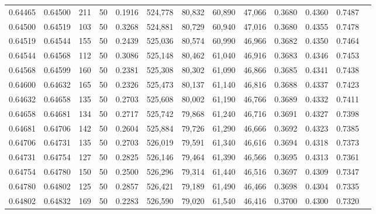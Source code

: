 \begin{tabular}{rrrrrrrrrrrrr}
0.64465 & 0.64500 &   211 &  50 &                                     0.1916 & 524,778 &  80,832 &  60,890 &  47,066 & 0.3680 & 0.4360 & 0.7487 \\
0.64500 & 0.64519 &   103 &  50 &                                     0.3268 & 524,881 &  80,729 &  60,940 &  47,016 & 0.3680 & 0.4355 & 0.7478 \\
0.64519 & 0.64544 &   155 &  50 &                                     0.2439 & 525,036 &  80,574 &  60,990 &  46,966 & 0.3682 & 0.4350 & 0.7464 \\
0.64544 & 0.64568 &   112 &  50 &                                     0.3086 & 525,148 &  80,462 &  61,040 &  46,916 & 0.3683 & 0.4346 & 0.7453 \\
0.64568 & 0.64599 &   160 &  50 &                                     0.2381 & 525,308 &  80,302 &  61,090 &  46,866 & 0.3685 & 0.4341 & 0.7438 \\
0.64600 & 0.64632 &   165 &  50 &                                     0.2326 & 525,473 &  80,137 &  61,140 &  46,816 & 0.3688 & 0.4337 & 0.7423 \\
0.64632 & 0.64658 &   135 &  50 &                                     0.2703 & 525,608 &  80,002 &  61,190 &  46,766 & 0.3689 & 0.4332 & 0.7411 \\
0.64658 & 0.64681 &   134 &  50 &                                     0.2717 & 525,742 &  79,868 &  61,240 &  46,716 & 0.3691 & 0.4327 & 0.7398 \\
0.64681 & 0.64706 &   142 &  50 &                                     0.2604 & 525,884 &  79,726 &  61,290 &  46,666 & 0.3692 & 0.4323 & 0.7385 \\
0.64706 & 0.64731 &   135 &  50 &                                     0.2703 & 526,019 &  79,591 &  61,340 &  46,616 & 0.3694 & 0.4318 & 0.7373 \\
0.64731 & 0.64754 &   127 &  50 &                                     0.2825 & 526,146 &  79,464 &  61,390 &  46,566 & 0.3695 & 0.4313 & 0.7361 \\
0.64754 & 0.64780 &   150 &  50 &                                     0.2500 & 526,296 &  79,314 &  61,440 &  46,516 & 0.3697 & 0.4309 & 0.7347 \\
0.64780 & 0.64802 &   125 &  50 &                                     0.2857 & 526,421 &  79,189 &  61,490 &  46,466 & 0.3698 & 0.4304 & 0.7335 \\
0.64802 & 0.64832 &   169 &  50 &                                     0.2283 & 526,590 &  79,020 &  61,540 &  46,416 & 0.3700 & 0.4300 & 0.7320 \\

\end{tabular}
